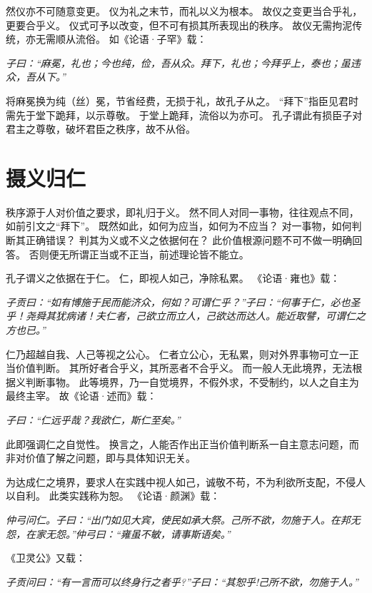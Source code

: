 \documentclass[11pt]{article}
\begin{document}
然仪亦不可随意变更。
仪为礼之末节，而礼以义为根本。
故仪之变更当合乎礼，更要合乎义。
仪式可予以改变，但不可有损其所表现出的秩序。
故仪无需拘泥传统，亦无需顺从流俗。
如《论语·子罕》载：

\textit{子曰：“麻冕，礼也；今也纯，俭，吾从众。拜下，礼也；今拜乎上，泰也；虽违众，吾从下。”}

将麻冕换为纯（丝）冕，节省经费，无损于礼，故孔子从之。
“拜下”指臣见君时需先于堂下跪拜，以示尊敬。
于堂上跪拜，流俗以为亦可。
孔子谓此有损臣子对君主之尊敬，破坏君臣之秩序，故不从俗。

\par

\section{摄义归仁}
秩序源于人对价值之要求，即礼归于义。
然不同人对同一事物，往往观点不同，如前引文之“拜下”。
既然如此，如何为应当，如何为不应当？
对一事物，如何判断其正确错误？
判其为义或不义之依据何在？
此价值根源问题不可不做一明确回答。
否则便无所谓正当或不正当，前述理论皆不能立。

\par

孔子谓义之依据在于仁。
仁，即视人如己，净除私累。
《论语·雍也》载：

\textit{子贡曰：“如有博施于民而能济众，何如？可谓仁乎？”子曰：“何事于仁，必也圣乎！尧舜其犹病诸！夫仁者，己欲立而立人，己欲达而达人。能近取譬，可谓仁之方也已。”}

仁乃超越自我、人己等视之公心。
仁者立公心，无私累，则对外界事物可立一正当价值判断。
其所好者合乎义，其所恶者不合乎义。
而一般人无此境界，无法根据义判断事物。
此等境界，乃一自觉境界，不假外求，不受制约，以人之自主为最终主宰。
故《论语·述而》载：

\textit{子曰：“仁远乎哉？我欲仁，斯仁至矣。”}

此即强调仁之自觉性。
换言之，人能否作出正当价值判断系一自主意志问题，而非对价值了解之问题，即与具体知识无关。

\par

为达成仁之境界，要求人在实践中视人如己，诚敬不苟，不为利欲所支配，不侵人以自利。
此类实践称为恕。
《论语·颜渊》载：

\textit{仲弓问仁。子曰：“出门如见大宾，使民如承大祭。己所不欲，勿施于人。在邦无怨，在家无怨。”仲弓曰：“雍虽不敏，请事斯语矣。”}

《卫灵公》又载：

\textit{子贡问曰：“有一言而可以终身行之者乎?”子曰：“其恕乎!己所不欲，勿施于人。”}
\end{document}
